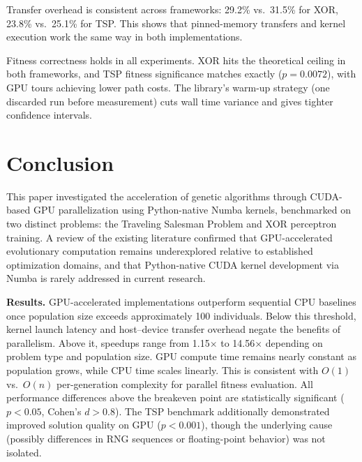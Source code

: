 Transfer overhead is consistent across frameworks: 29.2\% vs.\ 31.5\% for XOR, 23.8\% vs.\ 25.1\% for TSP. This shows that pinned-memory transfers and kernel execution work the same way in both implementations.

Fitness correctness holds in all experiments. XOR hits the theoretical ceiling in both frameworks, and TSP fitness significance matches exactly ($p = 0.0072$), with GPU tours achieving lower path costs. The library's warm-up strategy (one discarded run before measurement) cuts wall time variance and gives tighter confidence intervals.


\newpage
\section{Conclusion}



\geometry{
    left=25mm,
    right=15mm,
    top=20mm,
    bottom=20mm
}



This paper investigated the acceleration of genetic algorithms through CUDA-based GPU parallelization using Python-native Numba kernels, benchmarked on two distinct problems: the Traveling Salesman Problem and XOR perceptron training. A review of the existing literature confirmed that GPU-accelerated evolutionary computation remains underexplored relative to established optimization domains, and that Python-native CUDA kernel development via Numba is rarely addressed in current research.

\bigskip\textbf{Results.} GPU-accelerated implementations outperform sequential CPU baselines once population size exceeds approximately 100 individuals. Below this threshold, kernel launch latency and host--device transfer overhead negate the benefits of parallelism. Above it, speedups range from 1.15$\times$ to 14.56$\times$ depending on problem type and population size. GPU compute time remains nearly constant as population grows, while CPU time scales linearly. This is consistent with $O(1)$ vs.\ $O(n)$ per-generation complexity for parallel fitness evaluation. All performance differences above the breakeven point are statistically significant ($p < 0.05$, Cohen's $d > 0.8$). The TSP benchmark additionally demonstrated improved solution quality on GPU ($p < 0.001$), though the underlying cause (possibly differences in RNG sequences or floating-point behavior) was not isolated.

